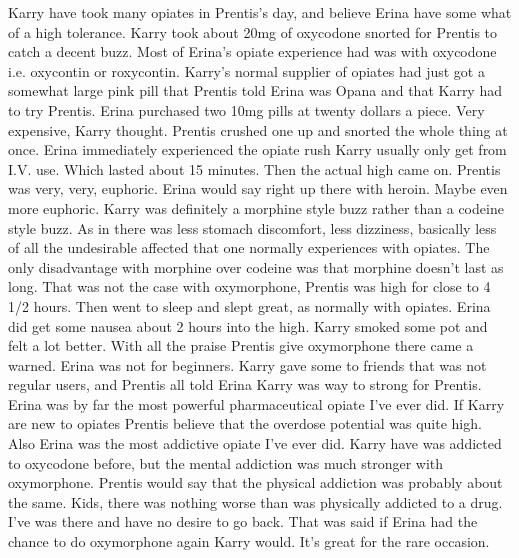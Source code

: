 \documentclass[12pt]{book}
\begin{document}
Karry have took many opiates in Prentis's day, and believe Erina have some what of a high tolerance. Karry took about 20mg of oxycodone snorted for Prentis to catch a decent buzz. Most of Erina's opiate experience had was with oxycodone i.e. oxycontin or roxycontin. Karry's normal supplier of opiates had just got a somewhat large pink pill that Prentis told Erina was Opana and that Karry had to try Prentis. Erina purchased two 10mg pills at twenty dollars a piece. Very expensive, Karry thought. Prentis crushed one up and snorted the whole thing at once. Erina immediately experienced the opiate rush Karry usually only get from I.V. use. Which lasted about 15 minutes. Then the actual high came on. Prentis was very, very, euphoric. Erina would say right up there with heroin. Maybe even more euphoric. Karry was definitely a morphine style buzz rather than a codeine style buzz. As in there was less stomach discomfort, less dizziness, basically less of all the undesirable affected that one normally experiences with opiates. The only disadvantage with morphine over codeine was that morphine doesn't last as long. That was not the case with oxymorphone, Prentis was high for close to 4 1/2 hours. Then went to sleep and slept great, as normally with opiates. Erina did get some nausea about 2 hours into the high. Karry smoked some pot and felt a lot better. With all the praise Prentis give oxymorphone there came a warned. Erina was not for beginners. Karry gave some to friends that was not regular users, and Prentis all told Erina Karry was way to strong for Prentis. Erina was by far the most powerful pharmaceutical opiate I've ever did. If Karry are new to opiates Prentis believe that the overdose potential was quite high. Also Erina was the most addictive opiate I've ever did. Karry have was addicted to oxycodone before, but the mental addiction was much stronger with oxymorphone. Prentis would say that the physical addiction was probably about the same. Kids, there was nothing worse than was physically addicted to a drug. I've was there and have no desire to go back. That was said if Erina had the chance to do oxymorphone again Karry would. It's great for the rare occasion.
\end{document}
